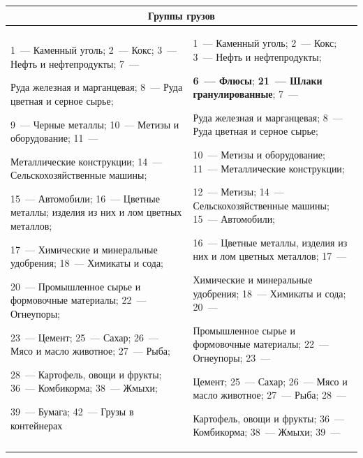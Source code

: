 \begin{table}\small

\begin{center}

\begin{tabular}{|p{7.8cm}||p{7.8cm}|}

\multicolumn{2}{c}{Группы грузов}\\[6pt]

\hline

 1~--- Каменный уголь; 2~--- Кокс;  3~--- Нефть и нефтепродукты; 7~---

 Руда железная и марганцевая; 8~--- Руда цветная и серное сырье;

 9~--- Черные металлы; 10~--- Метизы и оборудование; 11~---

 Металлические конструкции;  14~--- Сельскохозяйственные машины;

 15~--- Автомобили; 16~--- Цветные металлы; изделия из них и лом цветных металлов;

 17~--- Химические и минеральные удобрения; 18~--- Химикаты и сода;

 20~--- Промышленное сырье и формовочные материалы; 22~--- Огнеупоры;

 23~--- Цемент; 25~--- Сахар; 26~--- Мясо и масло животное; 27~--- Рыба;

 28~--- Картофель, овощи и фрукты; 36~--- Комбикорма;  38~--- Жмыхи;

 39~--- Бумага; 42~--- Грузы в контейнерах

 &

 1~--- Каменный уголь; 2~--- Кокс;  3~--- Нефть и нефтепродукты;

 \textbf{6~--- Флюсы}; \textbf{21~--- Шлаки гранулированные}; 7~---

 Руда железная и марганцевая; 8~--- Руда цветная и серное сырье;

 10~--- Метизы и оборудование; 11~--- Металлические конструкции;

 12~--- Метизы; 14~--- Сельскохозяйственные машины; 15~--- Автомобили;

 16~--- Цветные металлы, изделия из них и лом цветных металлов; 17~---

 Химические и минеральные удобрения; 18~--- Химикаты и сода;  20~---

 Промышленное сырье и формовочные материалы; 22~--- Огнеупоры; 23~---

 Цемент; 25~--- Сахар; 26~--- Мясо и масло животное; 27~--- Рыба; 28~---

 Картофель, овощи и фрукты; 36~--- Комбикорма;  38~--- Жмыхи;   39~---


\end{tabular}
\end{center}
\end{table}
